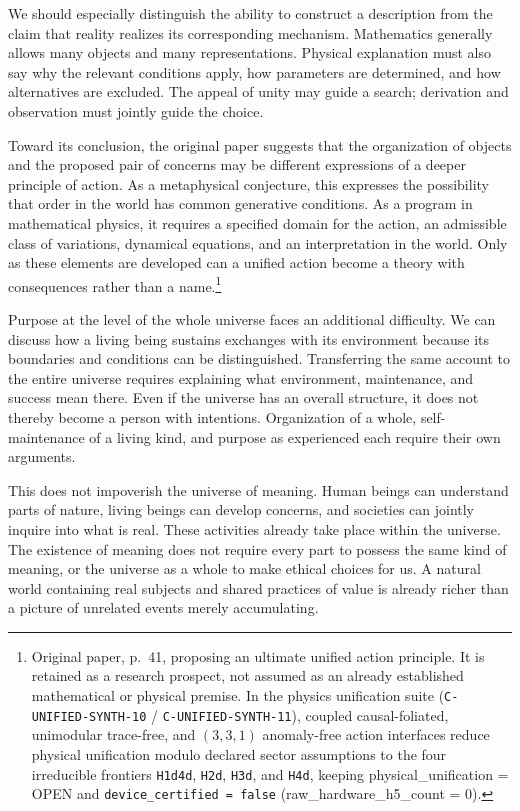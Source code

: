 \documentclass[
  english,
  11pt,
  oneside]{book}
\begin{document}
We should especially distinguish the ability to construct a description from the claim that reality realizes its corresponding mechanism. Mathematics generally allows many objects and many representations. Physical explanation must also say why the relevant conditions apply, how parameters are determined, and how alternatives are excluded. The appeal of unity may guide a search; derivation and observation must jointly guide the choice.

Toward its conclusion, the original paper suggests that the organization of objects and the proposed pair of concerns may be different expressions of a deeper principle of action. As a metaphysical conjecture, this expresses the possibility that order in the world has common generative conditions. As a program in mathematical physics, it requires a specified domain for the action, an admissible class of variations, dynamical equations, and an interpretation in the world. Only as these elements are developed can a unified action become a theory with consequences rather than a name.\footnote{\hypertarget{ph-note-66}{}Original paper, p.~41, proposing an ultimate unified action principle. It is retained as a research prospect, not assumed as an already established mathematical or physical premise. In the physics unification suite (\texttt{C-UNIFIED-SYNTH-10} / \texttt{C-UNIFIED-SYNTH-11}), coupled causal-foliated, unimodular trace-free, and \((3,3,1)\) anomaly-free action interfaces reduce physical unification modulo declared sector assumptions to the four irreducible frontiers \texttt{H1d4d}, \texttt{H2d}, \texttt{H3d}, and \texttt{H4d}, keeping physical\_unification = OPEN and \texttt{device\_certified\ =\ false} (raw\_hardware\_h5\_count = 0).}

Purpose at the level of the whole universe faces an additional difficulty. We can discuss how a living being sustains exchanges with its environment because its boundaries and conditions can be distinguished. Transferring the same account to the entire universe requires explaining what environment, maintenance, and success mean there. Even if the universe has an overall structure, it does not thereby become a person with intentions. Organization of a whole, self-maintenance of a living kind, and purpose as experienced each require their own arguments.

This does not impoverish the universe of meaning. Human beings can understand parts of nature, living beings can develop concerns, and societies can jointly inquire into what is real. These activities already take place within the universe. The existence of meaning does not require every part to possess the same kind of meaning, or the universe as a whole to make ethical choices for us. A natural world containing real subjects and shared practices of value is already richer than a picture of unrelated events merely accumulating.
\end{document}
